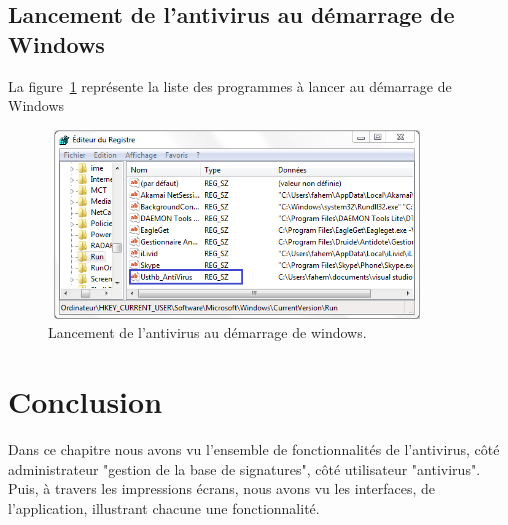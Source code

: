 \subsection*{Lancement de l'antivirus au démarrage de Windows}
La figure~\ref{fig :run} représente la liste des programmes à lancer au démarrage de Windows
\begin{figure}[H]
\begin{center}
\includegraphics[width=10cm, height=5cm]{Figures/run.png}
\caption{Lancement de l'antivirus au démarrage de windows.}
\label{fig :run} 
\end{center}
\end{figure}
\section{Conclusion}
Dans ce chapitre nous avons vu l'ensemble de fonctionnalités de l'antivirus, côté administrateur "gestion de la base de signatures", côté utilisateur "antivirus". \\

Puis, à travers les impressions écrans, nous avons vu les interfaces, de l'application, illustrant chacune une fonctionnalité. 
